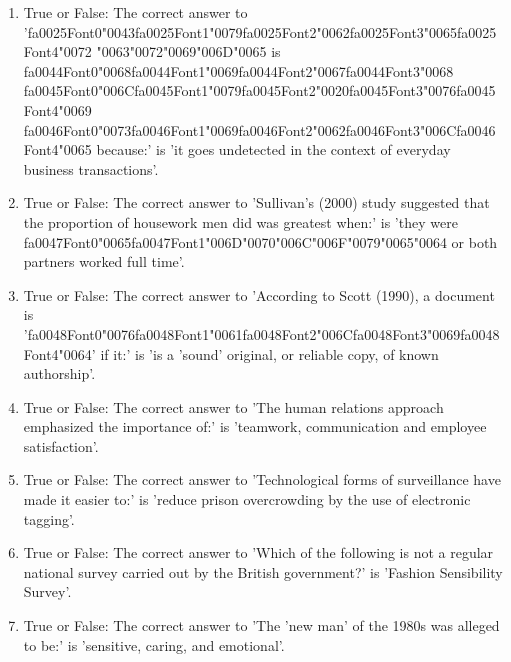 \documentclass[12pt]{article}
\begin{document}
\begin{enumerate}[label=\arabic*.]
\item True or False: The correct answer to '{\csname fa0025Font0\endcsname\char"0043}{\csname fa0025Font1\endcsname\char"0079}{\csname fa0025Font2\endcsname\char"0062}{\csname fa0025Font3\endcsname\char"0065}{\csname fa0025Font4\endcsname\char"0072} {\char"0063}{\char"0072}{\char"0069}{\char"006D}{\char"0065} is {\csname fa0044Font0\endcsname\char"0068}{\csname fa0044Font1\endcsname\char"0069}{\csname fa0044Font2\endcsname\char"0067}{\csname fa0044Font3\endcsname\char"0068} {\csname fa0045Font0\endcsname\char"006C}{\csname fa0045Font1\endcsname\char"0079}{\csname fa0045Font2\endcsname\char"0020}{\csname fa0045Font3\endcsname\char"0076}{\csname fa0045Font4\endcsname\char"0069} {\csname fa0046Font0\endcsname\char"0073}{\csname fa0046Font1\endcsname\char"0069}{\csname fa0046Font2\endcsname\char"0062}{\csname fa0046Font3\endcsname\char"006C}{\csname fa0046Font4\endcsname\char"0065} because:' is 'it goes undetected in the context of everyday business transactions'.
\item True or False: The correct answer to 'Sullivan's (2000) study suggested that the proportion of housework men did was greatest when:' is 'they were {\csname fa0047Font0\endcsname\char"0065}{\csname fa0047Font1\endcsname\char"006D}{\char"0070}{\char"006C}{\char"006F}{\char"0079}{\char"0065}{\char"0064} or both partners worked full time'.
\item True or False: The correct answer to 'According to Scott (1990), a document is '{\csname fa0048Font0\endcsname\char"0076}{\csname fa0048Font1\endcsname\char"0061}{\csname fa0048Font2\endcsname\char"006C}{\csname fa0048Font3\endcsname\char"0069}{\csname fa0048Font4\endcsname\char"0064}' if it:' is 'is a 'sound' original, or reliable copy, of known authorship'.
\item True or False: The correct answer to 'The human relations approach emphasized the importance of:' is 'teamwork, communication and employee satisfaction'.
\item True or False: The correct answer to 'Technological forms of surveillance have made it easier to:' is 'reduce prison overcrowding by the use of electronic tagging'.
\item True or False: The correct answer to 'Which of the following is not a regular national survey carried out by the British government?' is 'Fashion Sensibility Survey'.
\item True or False: The correct answer to 'The 'new man' of the 1980s was alleged to be:' is 'sensitive, caring, and emotional'.

\end{enumerate}
\end{document}
